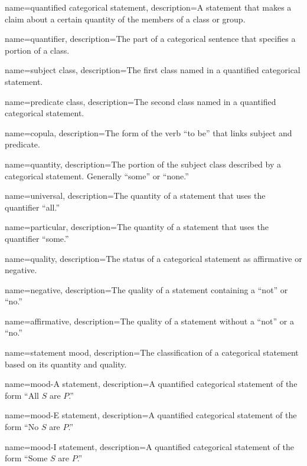 {
  name=quantified categorical statement,
  description={A statement that makes a claim about a certain quantity of the members of a class or group.}
}

{
  name=quantifier,
  description={The part of a categorical sentence that specifies a portion of a class.}
}

{
  name=subject class,
  description={The first class named in a quantified categorical statement.}
}

{
  name=predicate class,
  description={The second class named in a quantified categorical statement.}
  }

{
  name=copula,
  description={The form of the verb ``to be'' that links subject and predicate.}
}

{
name=quantity,
description={The portion of the subject class described by a categorical statement. Generally ``some'' or ``none.''}
}

{
name=universal,
description={The quantity of a statement that uses the quantifier ``all.''}
}

{
name=particular,
description={The quantity of a statement that uses the quantifier ``some.''}
}

{
name=quality,
description={The status of a categorical statement as affirmative or negative.}
}

{
name=negative,
description={The quality of a statement containing a ``not'' or ``no.''}
}

{
name=affirmative,
description={The quality of a statement without a ``not'' or a ``no.''}
}

{
name=statement mood,
description={The classification of a categorical statement based on its quantity and quality.}
}

{
name=mood-A statement,
description={A quantified categorical statement of the form ``All $S$ are $P$.''}
}

{
name=mood-E statement,
description={A quantified categorical statement of the form ``No $S$ are $P$.''}
}

{
name=mood-I statement,
description={A quantified categorical statement of the form ``Some $S$ are $P$.''}
}

